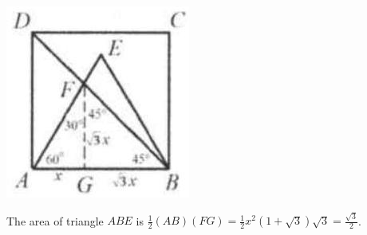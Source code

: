 \documentclass{article}
\begin{document}
\begin{center}
\includegraphics[width=\textwidth]{images/083(1).jpg}
\end{center}

The area of triangle \(A B E\) is \(\frac{1}{2}(A B)(F G)=\frac{1}{2} x^{2}(1+\sqrt{3}) \sqrt{3}=\frac{\sqrt{3}}{2}\).\\
\end{document}
